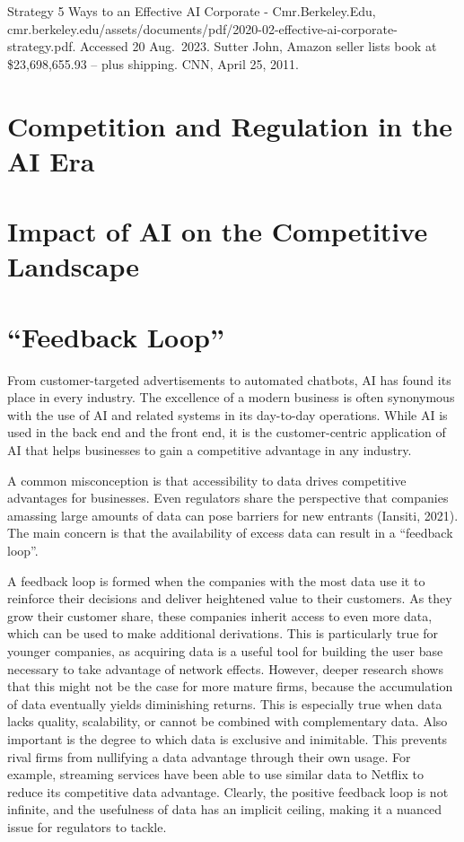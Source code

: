 \documentclass[
]{book}
\begin{document}
Strategy 5 Ways to an Effective AI Corporate - Cmr.Berkeley.Edu, cmr.berkeley.edu/assets/documents/pdf/2020-02-effective-ai-corporate-strategy.pdf. Accessed 20 Aug.~2023.
Sutter John, Amazon seller lists book at \$23,698,655.93 -- plus shipping. CNN, April 25, 2011.

\hypertarget{competition-and-regulation-in-the-ai-era-1}{%
\section{Competition and Regulation in the AI Era}\label{competition-and-regulation-in-the-ai-era-1}}

\hypertarget{impact-of-ai-on-the-competitive-landscape-1}{%
\section{Impact of AI on the Competitive Landscape}\label{impact-of-ai-on-the-competitive-landscape-1}}

\hypertarget{feedback-loop-1}{%
\section{``Feedback Loop''}\label{feedback-loop-1}}

From customer-targeted advertisements to automated chatbots, AI has found its place in every industry. The excellence of a modern business is often synonymous with the use of AI and related systems in its day-to-day operations. While AI is used in the back end and the front end, it is the customer-centric application of AI that helps businesses to gain a competitive advantage in any industry.

A common misconception is that accessibility to data drives competitive advantages for businesses. Even regulators share the perspective that companies amassing large amounts of data can pose barriers for new entrants (Iansiti, 2021). The main concern is that the availability of excess data can result in a ``feedback loop''.

A feedback loop is formed when the companies with the most data use it to reinforce their decisions and deliver heightened value to their customers. As they grow their customer share, these companies inherit access to even more data, which can be used to make additional derivations. This is particularly true for younger companies, as acquiring data is a useful tool for building the user base necessary to take advantage of network effects. However, deeper research shows that this might not be the case for more mature firms, because the accumulation of data eventually yields diminishing returns. This is especially true when data lacks quality, scalability, or cannot be combined with complementary data. Also important is the degree to which data is exclusive and inimitable. This prevents rival firms from nullifying a data advantage through their own usage. For example, streaming services have been able to use similar data to Netflix to reduce its competitive data advantage. Clearly, the positive feedback loop is not infinite, and the usefulness of data has an implicit ceiling, making it a nuanced issue for regulators to tackle.
\end{document}
